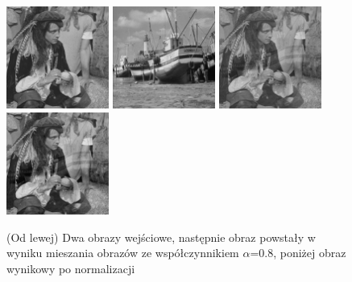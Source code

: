\documentclass[final,a4paper,openany,12pt]{mwbk}
\begin{document}
\begin{figure}[H]
	\begin{center}
		\includegraphics[width=0.3\textwidth]{2/2Gray_Img1_Mix_Original}
		\includegraphics[width=0.3\textwidth]{2/2Gray_Img2_Mix_Original}
		\includegraphics[width=0.3\textwidth]{2/2Gray_Img_Mix_Result}
		\includegraphics[width=0.3\textwidth]{2/2Gray_Img_Mix_Result_Norm}
	\end{center}
	\caption{(Od lewej) Dwa obrazy wejściowe, następnie obraz powstały w wyniku mieszania obrazów ze współczynnikiem $\alpha$=0.8, poniżej obraz wynikowy po normalizacji }
\end{figure}
\end{document}
